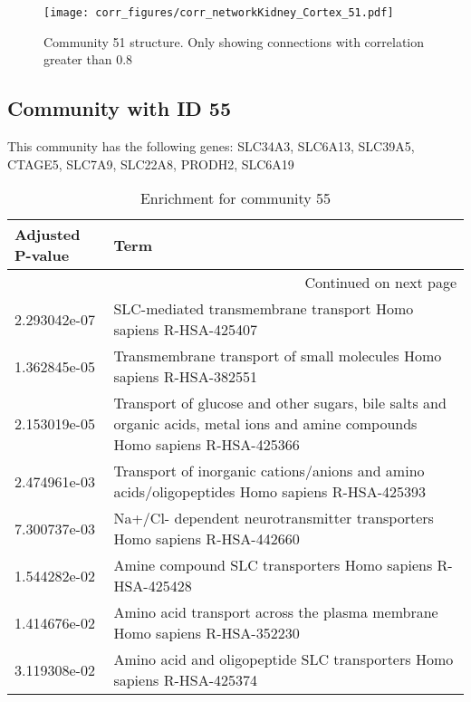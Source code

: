 \begin{figure}[h!]
\centering
\texttt{[image: corr\_figures/corr\_networkKidney\_Cortex\_51.pdf]}
\caption{Community 51 structure. Only showing connections with correlation greater than 0.8}
\end{figure}




\subsection*{Community with ID 55}
This community has the following genes: SLC34A3, SLC6A13, SLC39A5, CTAGE5, SLC7A9, SLC22A8, PRODH2, SLC6A19
\\
\begin{longtable}{p{2.4cm}p{14.5cm}}
\caption{Enrichment for community 55}\\
\toprule
Adjusted \newline P-value &                                                                                                                           Term \\
\midrule
\endhead
\midrule
\multicolumn{2}{r}{{Continued on next page}} \\
\midrule
\endfoot

\bottomrule
\endlastfoot
             2.293042e-07 &                                                                 SLC-mediated transmembrane transport Homo sapiens R-HSA-425407 \\
             1.362845e-05 &                                                           Transmembrane transport of small molecules Homo sapiens R-HSA-382551 \\
             2.153019e-05 &  Transport of glucose and other sugars, bile salts and organic acids, metal ions and amine compounds Homo sapiens R-HSA-425366 \\
             2.474961e-03 &                                  Transport of inorganic cations/anions and amino acids/oligopeptides Homo sapiens R-HSA-425393 \\
             7.300737e-03 &                                                      Na+/Cl- dependent neurotransmitter transporters Homo sapiens R-HSA-442660 \\
             1.544282e-02 &                                                                      Amine compound SLC transporters Homo sapiens R-HSA-425428 \\
             1.414676e-02 &                                                      Amino acid transport across the plasma membrane Homo sapiens R-HSA-352230 \\
             3.119308e-02 &                                                         Amino acid and oligopeptide SLC transporters Homo sapiens R-HSA-425374 \\
\end{longtable}


